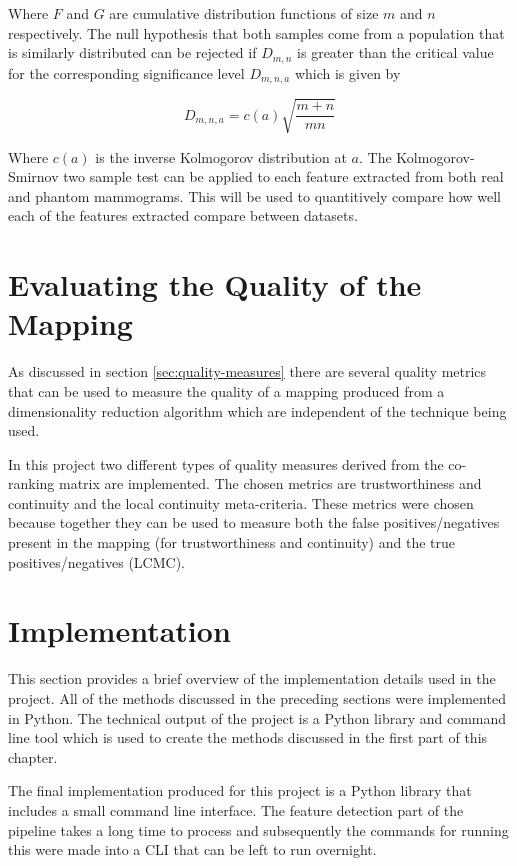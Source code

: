 Where $F$ and $G$ are cumulative distribution functions of size $m$ and $n$ respectively. The null hypothesis that both samples come from a population that is similarly distributed can be rejected if $D_{m,n}$ is greater than the critical value for the corresponding significance level $D_{m,n,a}$ which is given by

\begin{equation}
	D_{m,n,a} = c(a) \sqrt{ \frac{m+n}{mn} }
\end{equation}

Where $c(a)$ is the inverse Kolmogorov distribution at $a$. The Kolmogorov-Smirnov two sample test can be applied to each feature extracted from both real and phantom mammograms. This will be used to quantitively compare how well each of the features extracted compare between datasets. 


\section{Evaluating the Quality of the Mapping}
As discussed in section \ref{sec:quality-measures} there are several quality metrics that can be used to measure the quality of a mapping produced from a dimensionality reduction algorithm which are independent of the technique being used.

In this project two different types of quality measures derived from the co-ranking matrix are implemented. The chosen metrics are trustworthiness and continuity and the local continuity meta-criteria. These metrics were chosen because together they can be used to measure both the false positives/negatives present in the mapping (for trustworthiness and continuity) and the true positives/negatives (LCMC). 

\section{Implementation}
\label{sec:implementation}
This section provides a brief overview of the implementation details used in the project. All of the methods discussed in the preceding sections were implemented in Python. The technical output of the project is a Python library and command line tool which is used to create the methods discussed in the first part of this chapter.

The final implementation produced for this project is a Python library that includes a small command line interface. The feature detection part of the pipeline takes a long time to process and subsequently the commands for running this were made into a CLI that can be left to run overnight. 

